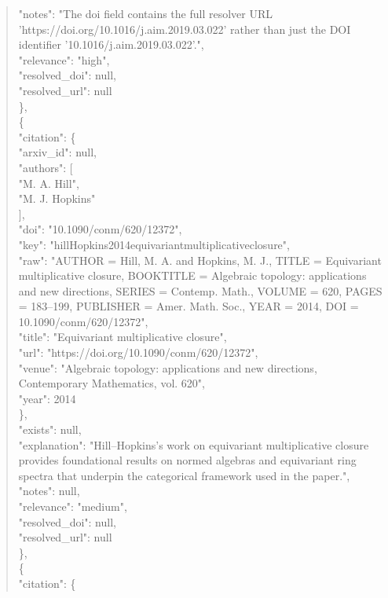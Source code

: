 \documentclass[11pt]{article}
\begin{document}
\begin{quote}
      "notes": "The doi field contains the full resolver URL 'https://doi.org/10.1016/j.aim.2019.03.022' rather than just the DOI identifier '10.1016/j.aim.2019.03.022'.",\\
      "relevance": "high",\\
      "resolved\_doi": null,\\
      "resolved\_url": null\\
    \},\\
    \{\\
      "citation": \{\\
        "arxiv\_id": null,\\
        "authors": [\\
          "M. A. Hill",\\
          "M. J. Hopkins"\\
        ],\\
        "doi": "10.1090/conm/620/12372",\\
        "key": "hillHopkins2014equivariantmultiplicativeclosure",\\
        "raw": "AUTHOR = Hill, M. A. and Hopkins, M. J., TITLE = Equivariant multiplicative closure, BOOKTITLE = Algebraic topology: applications and new directions, SERIES = Contemp. Math., VOLUME = 620, PAGES = 183--199, PUBLISHER = Amer. Math. Soc., YEAR = 2014, DOI = 10.1090/conm/620/12372",\\
        "title": "Equivariant multiplicative closure",\\
        "url": "https://doi.org/10.1090/conm/620/12372",\\
        "venue": "Algebraic topology: applications and new directions, Contemporary Mathematics, vol. 620",\\
        "year": 2014\\
      \},\\
      "exists": null,\\
      "explanation": "Hill--Hopkins's work on equivariant multiplicative closure provides foundational results on normed algebras and equivariant ring spectra that underpin the categorical framework used in the paper.",\\
      "notes": null,\\
      "relevance": "medium",\\
      "resolved\_doi": null,\\
      "resolved\_url": null\\
    \},\\
    \{\\
      "citation": \{\\

\end{quote}
\end{document}

